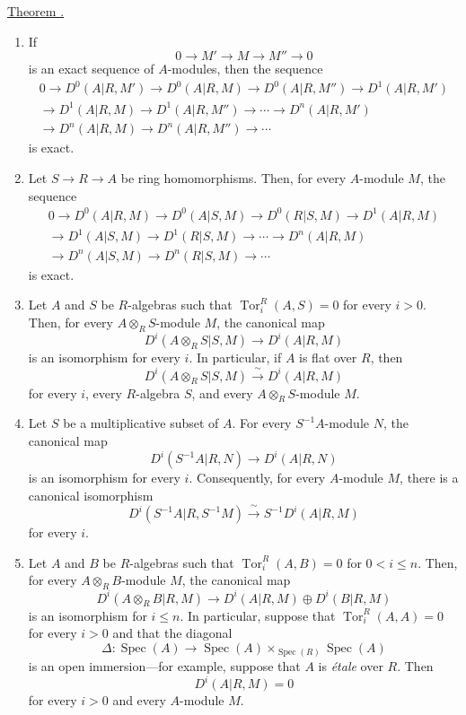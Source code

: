 
\underline{Theorem .}

\begin{enumerate}[label=(\arabic*)]
\item If
\[
 0\longrightarrow M'\longrightarrow M\longrightarrow M''
 \longrightarrow0
\]
is an exact sequence of $A$-modules, then the sequence
\begin{multline*}
0\longrightarrow D^0(A|R,M')\longrightarrow D^0(A|R,M)
\longrightarrow D^0(A|R,M'')\longrightarrow D^1(A|R,M')\\
\longrightarrow D^1(A|R,M)\longrightarrow D^1(A|R,M'')
\longrightarrow\cdots\longrightarrow D^n(A|R,M')\\
\longrightarrow D^n(A|R,M)\longrightarrow D^n(A|R,M'')
\longrightarrow\cdots
\end{multline*}
is exact.

\item Let $S\longrightarrow R\longrightarrow A$ be ring
homomorphisms. Then, for every $A$-module $M$, the sequence
\begin{multline*}
0\longrightarrow D^0(A|R,M)\longrightarrow D^0(A|S,M)
\longrightarrow D^0(R|S,M)\longrightarrow D^1(A|R,M)\\
\longrightarrow D^1(A|S,M)\longrightarrow D^1(R|S,M)
\longrightarrow\cdots\longrightarrow D^n(A|R,M)\\
\longrightarrow D^n(A|S,M)\longrightarrow D^n(R|S,M)
\longrightarrow\cdots
\end{multline*}
is exact.

\item Let $A$ and $S$ be $R$-algebras such that
$\operatorname{Tor}_i^R(A,S)=0$ for every $i>0$. Then, for every
$A\otimes_RS$-module $M$, the canonical map
\[
 D^i(A\otimes_RS|S,M)\longrightarrow D^i(A|R,M)
\]
is an isomorphism for every $i$. In particular, if $A$ is flat
over $R$, then
\[
 D^i(A\otimes_RS|S,M)\xrightarrow{\ \sim\ }D^i(A|R,M)
\]
for every $i$, every $R$-algebra $S$, and every
$A\otimes_RS$-module $M$.

\item Let $S$ be a multiplicative subset of $A$. For every
$S^{-1}A$-module $N$, the canonical map
\[
 D^i(S^{-1}A|R,N)\longrightarrow D^i(A|R,N)
\]
is an isomorphism for every $i$. Consequently, for every
$A$-module $M$, there is a canonical isomorphism
\[
 D^i(S^{-1}A|R,S^{-1}M)
 \xrightarrow{\ \sim\ }S^{-1}D^i(A|R,M)
\]
for every $i$.

\item Let $A$ and $B$ be $R$-algebras such that
$\operatorname{Tor}_i^R(A,B)=0$ for $0<i\leq n$. Then, for every
$A\otimes_RB$-module $M$, the canonical map
\[
 D^i(A\otimes_RB|R,M)
 \longrightarrow D^i(A|R,M)\oplus D^i(B|R,M)
\]
is an isomorphism for $i\leq n$. In particular, suppose that
$\operatorname{Tor}_i^R(A,A)=0$ for every $i>0$ and that the
diagonal
\[
 \Delta:\operatorname{Spec}(A)\longrightarrow
 \operatorname{Spec}(A)\times_{\operatorname{Spec}(R)}
 \operatorname{Spec}(A)
\]
is an open immersion---for example, suppose that $A$ is \emph{étale}
over $R$. Then
\[
 D^i(A|R,M)=0
\]
for every $i>0$ and every $A$-module $M$.



\end{enumerate}
